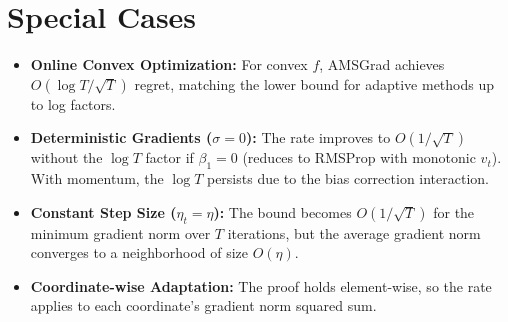 \documentclass{article}
\begin{document}
\section*{Special Cases}

\begin{itemize}
    \item \textbf{Online Convex Optimization:} For convex $f$, AMSGrad achieves $O(\log T / \sqrt{T})$ regret, matching the lower bound for adaptive methods up to log factors.
    \item \textbf{Deterministic Gradients ($\sigma=0$):} The rate improves to $O(1/\sqrt{T})$ without the $\log T$ factor if $\beta_1=0$ (reduces to RMSProp with monotonic $v_t$). With momentum, the $\log T$ persists due to the bias correction interaction.
    \item \textbf{Constant Step Size ($\eta_t = \eta$):} The bound becomes $O(1/\sqrt{T})$ for the minimum gradient norm over $T$ iterations, but the average gradient norm converges to a neighborhood of size $O(\eta)$.
    \item \textbf{Coordinate-wise Adaptation:} The proof holds element-wise, so the rate applies to each coordinate's gradient norm squared sum.
\end{itemize}
\end{document}
